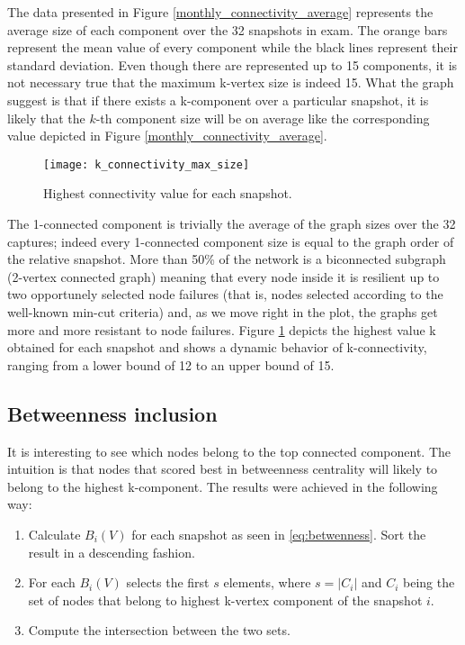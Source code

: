 	The data presented in Figure \ref{monthly_connectivity_average} represents the average size of each component over the 32 snapshots in exam. The orange bars represent the mean value of every component while the black lines represent their standard deviation. Even though there are represented up to 15 components, it is not necessary true that the maximum k-vertex size is indeed 15. What the graph suggest is that if there exists a k-component over a particular snapshot, it is likely that the $k$-th component size will be on average like the corresponding value depicted in Figure \ref{monthly_connectivity_average}.
	
	\begin{figure}
		\texttt{[image: k\_connectivity\_max\_size]}
		\caption{Highest connectivity value for each snapshot.}
		\label{monthly_connectivity_max_size}
	\end{figure}
	
	The 1-connected component is trivially the average of the graph sizes over the 32 captures; indeed every 1-connected component size is equal to the graph order of the relative snapshot. More than 50\% of the network is a biconnected subgraph (2-vertex connected graph) meaning that every node inside it is resilient up to two opportunely selected node failures (that is, nodes selected according to the well-known min-cut criteria) and, as we move right in the plot, the graphs get more and more resistant to node failures. Figure \ref{monthly_connectivity_max_size} depicts the highest value k obtained for each snapshot and shows a dynamic behavior of k-connectivity, ranging from a lower bound of 12 to an upper bound of 15.
	
	\subsection{Betweenness inclusion}
	
	It is interesting to see which nodes belong to the top connected component. The intuition is that nodes that scored best in betweenness centrality will likely to belong to the highest k-component. The results were achieved in the following way:
	\begin{enumerate}
		\item Calculate $B_i(V)$ for each snapshot as seen in \ref{eq:betwenness}. Sort the result in a descending fashion. 
		\item For each $B_i(V)$ selects the first $s$ elements, where $s = |C_i|$ and $C_i$ being the set of nodes that belong to highest k-vertex component of the snapshot $i$.
		\item Compute the intersection between the two sets.
	\end{enumerate}
	
